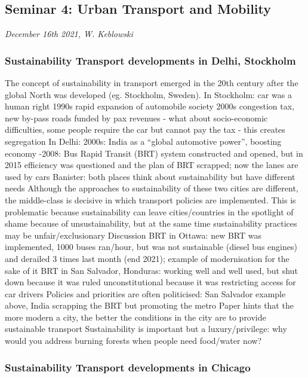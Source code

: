 \documentclass{article}
\begin{document}
\subsection{Seminar 4: Urban Transport and Mobility}
\textit{December 16th 2021, W. Keblowski}

\subsubsection{Sustainability Transport developments in Delhi, Stockholm}

\begin{outline}
	\1 The concept of sustainability in transport emerged in the 20th century after the global North was developed (eg. Stockholm, Sweden). 
	\1 In Stockholm: 
		 car was a human right
		\2 1990s rapid expansion of automobile society
		\2 2000s congestion tax, new by-pass roads funded by pax revenues - what about socio-economic difficulties, some people require the car but cannot pay the tax - this creates segregation
	\1 In Delhi:
		\2 2000s: India as a ``global automotive power'', boosting economy
		-2008: Bus Rapid Transit (BRT) system constructed and opened, but in 2015 efficiency was questioned and the plan of BRT scrapped; now the lanes are used by cars
	\1 Banister: both places think about sustainability but have different needs 
	\1 Although the approaches to sustainability of these two cities are different, the middle-class is decisive in which transport policies are implemented. This is problematic because sustainability can leave cities/countries in the spotlight of shame because of unsustainability, but at the same time sustainability practices may be unfair/exclusionary
	\1 Discussion
		\2 BRT in Ottawa: new BRT was implemented, 1000 buses ran/hour, but was not sustainable (diesel bus engines) and derailed 3 times last month (end 2021); example of modernisation for the sake of it
		\2 BRT in San Salvador, Honduras: working well and well used, but shut down because it was ruled unconstitutional because it was restricting access for car drivers
		\2 Policies and priorities are often politicised: San Salvador example above, India scrapping the BRT but promoting the metro
		\2 Paper hints that the more modern a city, the better the conditions in the city are to provide sustainable transport
		\2 Sustainability is important but a luxury/privilege: why would you address burning forests when people need food/water now?
\end{outline}

\subsubsection{Sustainability Transport developments in Chicago}
\end{document}
